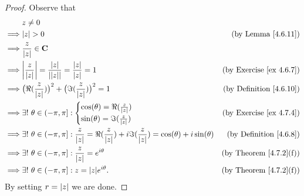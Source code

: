 \begin{proof}
    Observe that
    \begin{align*}
                 & z \neq 0                                                                                                                                                                          \\
        \implies & \abs*{z} > 0                                                                                                                                & \text{(by Lemma \ref{4.6.11})}      \\
        \implies & \frac{z}{\abs*{z}} \in \mathbf{C}                                                                                                                                                 \\
        \implies & \abs*{\frac{z}{\abs*{z}}} = \frac{\abs*{z}}{\abs*{\abs*{z}}} = \frac{\abs*{z}}{\abs*{z}} = 1                                                & \text{(by Exercise \ref{ex 4.6.7})} \\
        \implies & \big(\Re(\frac{z}{\abs*{z}})\big)^2 + \big(\Im(\frac{z}{\abs*{z}})\big)^2 = 1                                                               & \text{(by Definition \ref{4.6.10})} \\
        \implies & \exists!\ \theta \in (-\pi, \pi] : \begin{cases}
                                                          \cos(\theta) = \Re(\frac{z}{\abs*{z}}) \\
                                                          \sin(\theta) = \Im(\frac{z}{\abs*{z}})
                                                      \end{cases}                                                                    & \text{(by Exercise \ref{ex 4.7.4})}                           \\
        \implies & \exists!\ \theta \in (-\pi, \pi] : \frac{z}{\abs*{z}} = \Re(\frac{z}{\abs*{z}}) + i \Im(\frac{z}{\abs*{z}}) = \cos(\theta) + i \sin(\theta) & \text{(by Definition \ref{4.6.8})}  \\
        \implies & \exists!\ \theta \in (-\pi, \pi] : \frac{z}{\abs*{z}} = e^{i \theta}                                                                        & \text{(by Theorem \ref{4.7.2}(f))}  \\
        \implies & \exists!\ \theta \in (-\pi, \pi] : z = \abs*{z} e^{i \theta}.                                                                               & \text{(by Theorem \ref{4.7.2}(f))}
    \end{align*}
    By setting \(r = \abs*{z}\) we are done.
\end{proof}

